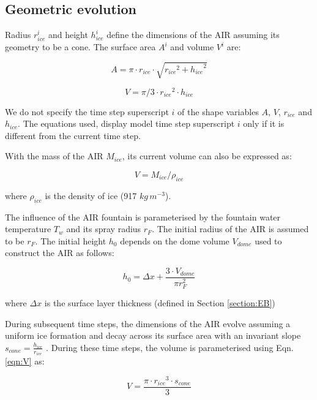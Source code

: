 \documentclass[utf8]{frontiersSCNS} %
\begin{document}
\subsection{Geometric evolution}

Radius $r_{ice}^i$ and height $h_{ice}^i$ define the dimensions of the AIR assuming its geometry to be a cone. The
surface area $A^i$ and volume $V^i$ are:

\begin{equation} A = \pi \cdot r_{ice} \cdot \sqrt{{r_{ice}}^2 + {h_{ice}}^ 2} \label{eqn:A} \end{equation}

\begin{equation} V = \pi/3 \cdot {r_{ice}}^2 \cdot h_{ice} \label{eqn:V} \end{equation}

We do not specify the time step superscript $i$ of the shape variables $A$, $V$, $r_{ice}$ and $h_{ice}$. The equations
used, display model time step superscript $i$ only if it is different from the current time step.

With the mass of the AIR $M_{ice}$, its current volume can also be expressed as:

\begin{equation} V = M_{ice} /\rho_{ice} \label{eqn:V1} \end{equation}

where $\rho_{ice}$ is the density of ice (917 $kg\, m^{-3}$).


The influence of the AIR fountain is parameterised by the fountain water temperature $T_{w}$ and its spray radius $r_F$.
The initial radius of the AIR is assumed to be $r_F$. The initial height $h_0$ depends on the dome volume $V_{dome}$
used to construct the AIR as follows:

\begin{equation}
	h_{0} =  \Delta x + \frac{3 \cdot V_{dome}}{\pi r_F^2 }
	\label{eqn:h0}
\end{equation}

where $\Delta x$ is the surface layer thickness (defined in Section \ref{section:EB})

During subsequent time steps, the dimensions of the AIR evolve assuming a uniform ice formation and decay across its
surface area with an invariant slope $s_{cone} = \frac{h_{ice}}{r_{ice}}$ .  During these time steps, the volume is
parameterised using Eqn. \ref{eqn:V} as:

\begin{equation} V = \frac{\pi \cdot {r_{ice}}^3
		\cdot s_{cone}}{3} \label{eqn:V2} \end{equation}
\end{document}
